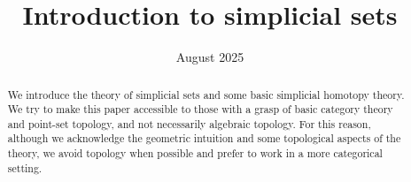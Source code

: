 \documentclass{article}
\title{Introduction to simplicial sets}
\date{August 2025}
\begin{document}
\maketitle

\begin{abstract}
	We introduce the theory of simplicial sets and some basic simplicial homotopy theory. We try to make this paper accessible to those with a grasp of basic category theory and point-set topology, and not necessarily algebraic topology. For this reason, although we acknowledge the geometric intuition and some topological aspects of the theory, we avoid topology when possible and prefer to work in a more categorical setting.
\end{abstract}

\tableofcontents





%

\appendix




\end{document}
